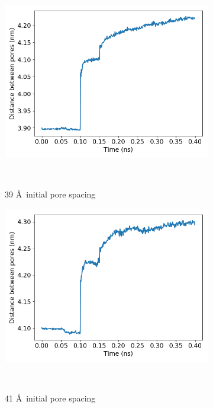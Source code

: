 \documentclass{article}
\begin{document}
  	\begin{figure}[!htb]
	\centering
	\begin{subfigure}{0.3\textwidth}
		\includegraphics[width=\textwidth]{p2p_39.png}\quad
		\vspace{-1.25em}
		\caption{39 \AA~initial pore spacing}~\label{fig:p2p_39}
	\end{subfigure}
	\begin{subfigure}{0.3\textwidth}
		\includegraphics[width=\textwidth]{p2p_41.png}\quad
		\vspace{-1.25em}
		\caption{41 \AA~initial pore spacing}~\label{fig:p2p_41}
	\end{subfigure}
	\begin{subfigure}{0.3\textwidth}

\end{subfigure}
\end{figure}
\end{document}
